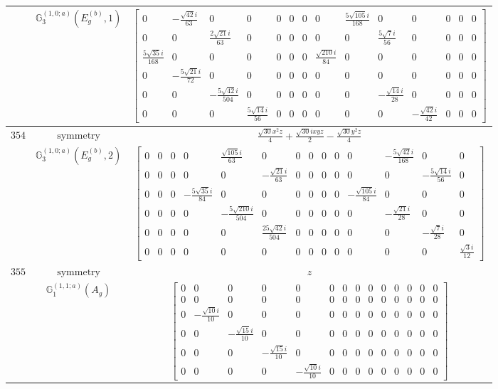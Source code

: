 \documentclass[fleqn,8pt,landscape]{jsarticle}
\begin{document}
\begin{longtable}{ccc}
$  $ & $ \mathbb{G}_{3}^{(1,0;a)}(E_{g}^{(b)},1) $ & $ \begin{bmatrix} 0 & - \frac{\sqrt{42} i}{63} & 0 & 0 & 0 & 0 & 0 & 0 & \frac{5 \sqrt{105} i}{168} & 0 & 0 & 0 & 0 & 0 \\ 0 & 0 & \frac{2 \sqrt{21} i}{63} & 0 & 0 & 0 & 0 & 0 & 0 & \frac{5 \sqrt{7} i}{56} & 0 & 0 & 0 & 0 \\ \frac{5 \sqrt{35} i}{168} & 0 & 0 & 0 & 0 & 0 & 0 & \frac{\sqrt{210} i}{84} & 0 & 0 & 0 & 0 & 0 & 0 \\ 0 & - \frac{5 \sqrt{21} i}{72} & 0 & 0 & 0 & 0 & 0 & 0 & 0 & 0 & 0 & 0 & 0 & 0 \\ 0 & 0 & - \frac{5 \sqrt{42} i}{504} & 0 & 0 & 0 & 0 & 0 & 0 & - \frac{\sqrt{14} i}{28} & 0 & 0 & 0 & 0 \\ 0 & 0 & 0 & \frac{5 \sqrt{14} i}{56} & 0 & 0 & 0 & 0 & 0 & 0 & - \frac{\sqrt{42} i}{42} & 0 & 0 & 0 \end{bmatrix} $ \\ \hline
$ 354 $ & $ \text{symmetry} $ & $ \frac{\sqrt{30} x^{2} z}{4} + \frac{\sqrt{30} i x y z}{2} - \frac{\sqrt{30} y^{2} z}{4} $ \\
$  $ & $ \mathbb{G}_{3}^{(1,0;a)}(E_{g}^{(b)},2) $ & $ \begin{bmatrix} 0 & 0 & 0 & 0 & \frac{\sqrt{105} i}{63} & 0 & 0 & 0 & 0 & 0 & 0 & - \frac{5 \sqrt{42} i}{168} & 0 & 0 \\ 0 & 0 & 0 & 0 & 0 & - \frac{\sqrt{21} i}{63} & 0 & 0 & 0 & 0 & 0 & 0 & - \frac{5 \sqrt{14} i}{56} & 0 \\ 0 & 0 & 0 & - \frac{5 \sqrt{35} i}{84} & 0 & 0 & 0 & 0 & 0 & 0 & - \frac{\sqrt{105} i}{84} & 0 & 0 & 0 \\ 0 & 0 & 0 & 0 & - \frac{5 \sqrt{210} i}{504} & 0 & 0 & 0 & 0 & 0 & 0 & - \frac{\sqrt{21} i}{28} & 0 & 0 \\ 0 & 0 & 0 & 0 & 0 & \frac{25 \sqrt{42} i}{504} & 0 & 0 & 0 & 0 & 0 & 0 & - \frac{\sqrt{7} i}{28} & 0 \\ 0 & 0 & 0 & 0 & 0 & 0 & 0 & 0 & 0 & 0 & 0 & 0 & 0 & \frac{\sqrt{3} i}{12} \end{bmatrix} $ \\ \hline
$ 355 $ & $ \text{symmetry} $ & $ z $ \\
$  $ & $ \mathbb{G}_{1}^{(1,1;a)}(A_{g}) $ & $ \begin{bmatrix} 0 & 0 & 0 & 0 & 0 & 0 & 0 & 0 & 0 & 0 & 0 & 0 & 0 & 0 \\ 0 & 0 & 0 & 0 & 0 & 0 & 0 & 0 & 0 & 0 & 0 & 0 & 0 & 0 \\ 0 & - \frac{\sqrt{10} i}{10} & 0 & 0 & 0 & 0 & 0 & 0 & 0 & 0 & 0 & 0 & 0 & 0 \\ 0 & 0 & - \frac{\sqrt{15} i}{10} & 0 & 0 & 0 & 0 & 0 & 0 & 0 & 0 & 0 & 0 & 0 \\ 0 & 0 & 0 & - \frac{\sqrt{15} i}{10} & 0 & 0 & 0 & 0 & 0 & 0 & 0 & 0 & 0 & 0 \\ 0 & 0 & 0 & 0 & - \frac{\sqrt{10} i}{10} & 0 & 0 & 0 & 0 & 0 & 0 & 0 & 0 & 0 \end{bmatrix} $ \\ \hline

\end{longtable}
\end{document}
